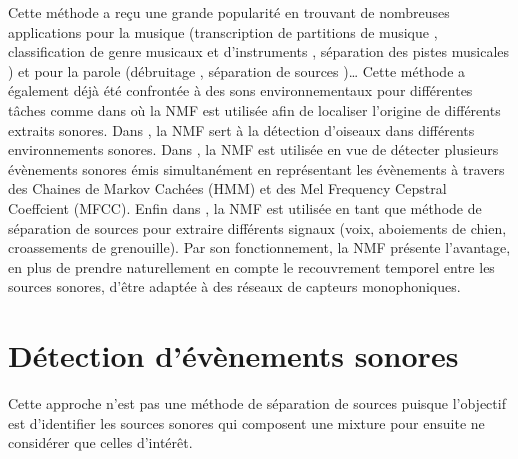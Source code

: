 Cette méthode a reçu une grande popularité en trouvant de nombreuses applications pour la musique (transcription de partitions de musique \cite{smaragdis_non-negative_2003,bertin2009tempering}, classification de genre musicaux \cite{panagakis2008music} et d'instruments \cite{benetos2006musical}, séparation des pistes musicales \cite{souviraa2015music}) et pour la parole (débruitage \cite{wilson2008speech,sprechmann2014supervised}, séparation de sources \cite{smaragdis2007convolutive, 
hurmalainen2012detection})\dots{}
Cette méthode a également déjà été confrontée à des sons environnementaux pour différentes tâches comme dans \cite{kumar2016audio} où la NMF est utilisée afin de localiser l'origine de différents extraits sonores. Dans \cite{sobieraj2017masked}, la NMF sert à la détection d'oiseaux dans différents environnements sonores. Dans \cite{heittola_sound_2011}, la NMF est utilisée en vue de détecter plusieurs évènements sonores émis simultanément en représentant les évènements à travers des Chaines de Markov Cachées (HMM) et des Mel Frequency Cepstral Coeffcient (MFCC).  Enfin dans \cite{satoshi_innami_nmf-based_2012}, la NMF est utilisée en tant que méthode de séparation de sources pour extraire différents signaux (voix, aboiements de chien, croassements de grenouille).
Par son fonctionnement, la NMF présente l'avantage, en plus de prendre naturellement en compte le recouvrement temporel entre les sources sonores, d'être adaptée à des réseaux de capteurs monophoniques.


\section{Détection d'évènements sonores}

Cette approche n'est pas une méthode de séparation de sources puisque l'objectif est d'identifier les sources sonores qui composent une mixture pour ensuite ne considérer que celles d'intérêt.

